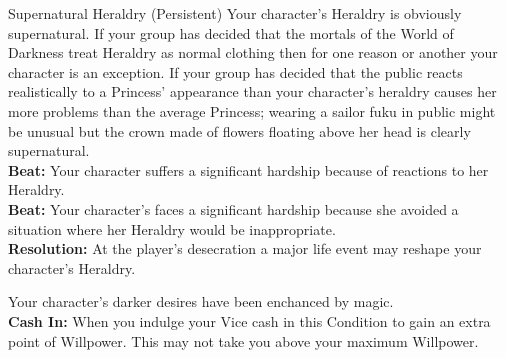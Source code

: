 \documentclass[10pt, frontgrid, backgrid]{flacards}
\begin{document}
\Cond 
{Supernatural Heraldry (Persistent)}
{Your character’s Heraldry is obviously supernatural. If your group has decided that the mortals of the World of Darkness treat Heraldry as normal clothing then for one reason or another your character is an exception. If your group has decided that the public reacts realistically to a Princess' appearance than your character’s heraldry causes her more problems than the average Princess; wearing a sailor fuku in public might be unusual but the crown made of flowers floating above her head is clearly supernatural. \\

\textbf{Beat:} Your character suffers a significant hardship because of reactions to her Heraldry.\\
\textbf{Beat:} Your character's faces a significant hardship because she avoided a situation where her Heraldry would be inappropriate.\\
\textbf{Resolution:} At the player's desecration a major life event may reshape your character’s Heraldry. }



{Your character's darker desires have been enchanced by magic. \\

\textbf{Cash In:} When you indulge your Vice cash in this Condition to gain an extra point of Willpower. This may not take you above your maximum Willpower. }
\end{document}
